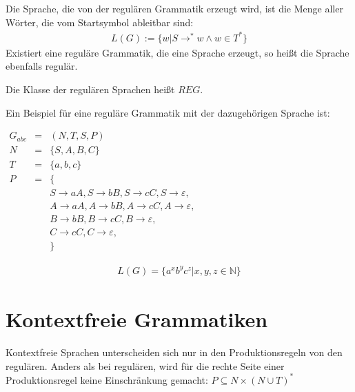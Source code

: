 \documentclass[a4paper,12pt]{report}
\begin{document}
Die Sprache, die von der regulären Grammatik erzeugt wird, ist die Menge aller Wörter, die vom Startsymbol ableitbar sind: 
\begin{eqnarray}
  L(G) := \{w | S \rightarrow^* w \land w\in T^* \} 
\end{eqnarray}
Existiert eine reguläre Grammatik, die eine Sprache erzeugt, so heißt die Sprache ebenfalls regulär.

Die Klasse der regulären Sprachen heißt $REG$.

Ein Beispiel für eine reguläre Grammatik mit der dazugehörigen Sprache ist: 

\begin{center}
 $
\begin{array}{rcl}
  G_{abc} &=& (N,T,S,P) \\
  N &=& \{ S, A, B, C \} \\
  T &=& \{ a, b, c \} \\
  P &=& \{ \\ 
  &&  S \rightarrow a A,
    S \rightarrow b B,
    S \rightarrow c C,
    S \rightarrow \varepsilon,\\
  &&  A \rightarrow a A,
    A \rightarrow b B,
    A \rightarrow c C,
    A \rightarrow \varepsilon,\\
  &&  B \rightarrow b B,
    B \rightarrow c C,
    B \rightarrow \varepsilon, \\
  &&  C \rightarrow c C,
    C \rightarrow \varepsilon,\\
  &&\}
\end{array}
\label{regGramEx}
$ 
\end{center}

\begin{eqnarray}
  L(G) = \{ a^xb^yc^z | x,y,z\in \mathbb{N} \} 
\end{eqnarray}



\section{Kontextfreie Grammatiken}
\label{cfGram}

Kontextfreie Sprachen unterscheiden sich nur in den Produktionsregeln von den regulären. Anders als bei regulären, wird für die rechte Seite einer Produktionsregel keine Einschränkung gemacht: $P \subseteq N\times (N\cup T)^*$

% 
\end{document}

